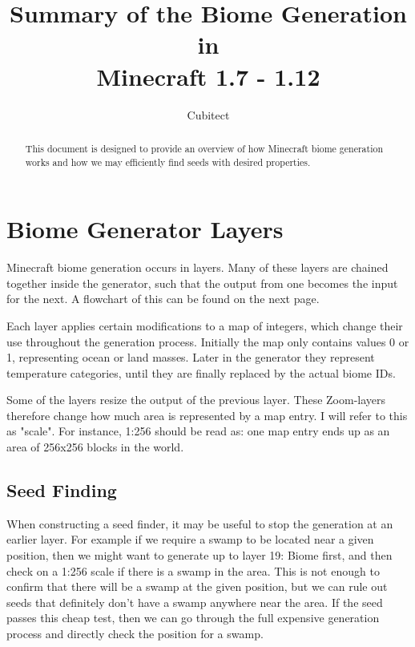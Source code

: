 \documentclass{article}
\title{Summary of the Biome Generation in \\ Minecraft 1.7 - 1.12}
\author{Cubitect}
\begin{document}
	
	\maketitle
	
	\begin{abstract}
		This document is designed to provide an overview of how Minecraft biome generation works and how we may efficiently find seeds with desired properties.
	\end{abstract}
	
	\newpage
	
	\tableofcontents
	
	
	
	\newpage
	
	
	\section{Biome Generator Layers}

	Minecraft biome generation occurs in layers. Many of these layers are chained together inside the generator, such that the output from one becomes the input for the next. A flowchart of this can be found on the next page.
	
	Each layer applies certain modifications to a map of integers, which change their use throughout the generation process. Initially the map only contains values 0 or 1, representing ocean or land masses. Later in the generator they represent temperature categories, until they are finally replaced by the actual biome IDs.
	
	Some of the layers resize the output of the previous layer. These Zoom-layers therefore change how much area is represented by a map entry. I will refer to this as "scale". For instance, 1:256 should be read as: one map entry ends up as an area of 256x256 blocks in the world.
	
	\setcounter{subsection}{-1}
	\subsection{Seed Finding}
	
	When constructing a seed finder, it may be useful to stop the generation at an earlier layer. For example if we require a swamp to be located near a given position, then we might want to generate up to layer 19: Biome first, and then check on a 1:256 scale if there is a swamp in the area. This is not enough to confirm that there will be a swamp at the given position, but we can rule out seeds that definitely don't have a swamp anywhere near the area. If the seed passes this cheap test, then we can go through the full expensive generation process and directly check the position for a swamp.
	
\end{document}
